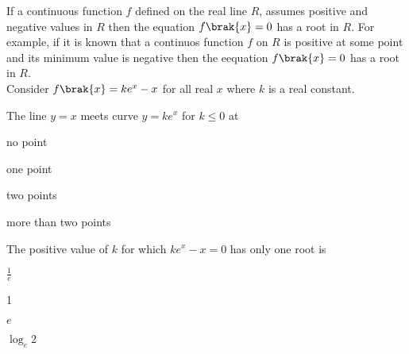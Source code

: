\iffalse
\title{Assignment}
\author{Y.Harsha Vardhan Reddy}
\section{paragraph}
\fi
\item {
If a continuous function $f$ defined on the real line $R$, assumes positive and negative values in $R$ then the equation $f\brak{x}=0$ has a root in $R$. For example, if it is known that a continuos function $f$ on $R$ is positive at some point and its minimum value is negative then the eequation $f\brak{x}=0$ has a root in $R$.\\
 Consider $f\brak{x}=ke^x-x$ for all real $x$ where $k$ is a real constant.
 \item The line $y=x$ meets curve $y=ke^x$ for $k \le 0$ at
 \hfill {}\\
    \begin{enumerate}
\begin{multicols}{2}
\item no point
\columnbreak
\item one point
\end{multicols}
\begin{multicols}{2}
\item two points
\item more than two points
\end{multicols}
\end{enumerate}

  



\item  The positive value of $k$ for which $ke^x-x=0$ has only one root is
\hfill {}\\
\begin{enumerate}
\begin{multicols}{2}
\item $\frac{1}{e}$
\columnbreak
\item 1
\end{multicols}
\begin{multicols}{2}
\item $e$
\item $\log_e{2}$
\end{multicols}
\end{enumerate}




}
